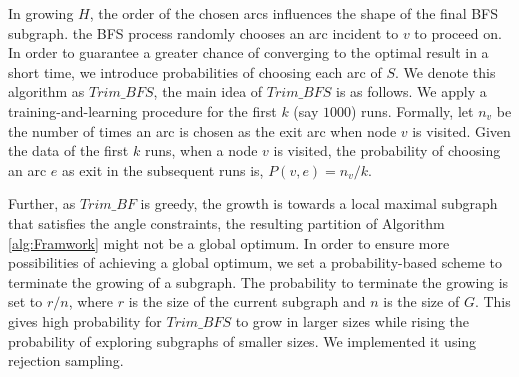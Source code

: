 {In growing $H$, the order of the chosen arcs influences the shape of the final BFS subgraph. the BFS process randomly chooses an arc incident to $v$ to proceed on. In order to guarantee a greater chance of converging to the optimal result in a short time, we introduce probabilities of choosing each arc of $S$. We denote this algorithm as \textbf{$Trim\_BFS$}, the main idea of $Trim\_BFS$ is as follows.
We apply a training-and-learning procedure for the first $k$ (say $1000$) runs. Formally, let $n_v$ be the number of times an arc is chosen as the exit arc when node $v$ is visited. Given the data of the first $k$ runs, when a node $v$ is visited, the probability of choosing an arc $e$ as exit in the subsequent runs is, $P(v, e) = n_v/k$.


Further, as $Trim\_BF$ is greedy, the growth is towards a local maximal subgraph that satisfies the angle constraints, the resulting partition of Algorithm \ref{alg:Framwork} might not be a global optimum. In order to ensure more possibilities of achieving a global optimum, we set a probability-based scheme to terminate the growing of a subgraph. The probability to terminate the growing is set to $r/n$, where $r$ is the size of the current subgraph and $n$ is the size of $G$. This gives high probability for $Trim\_BFS$ to grow in larger sizes while rising the probability of exploring subgraphs of smaller sizes. We implemented it using rejection sampling.








}
